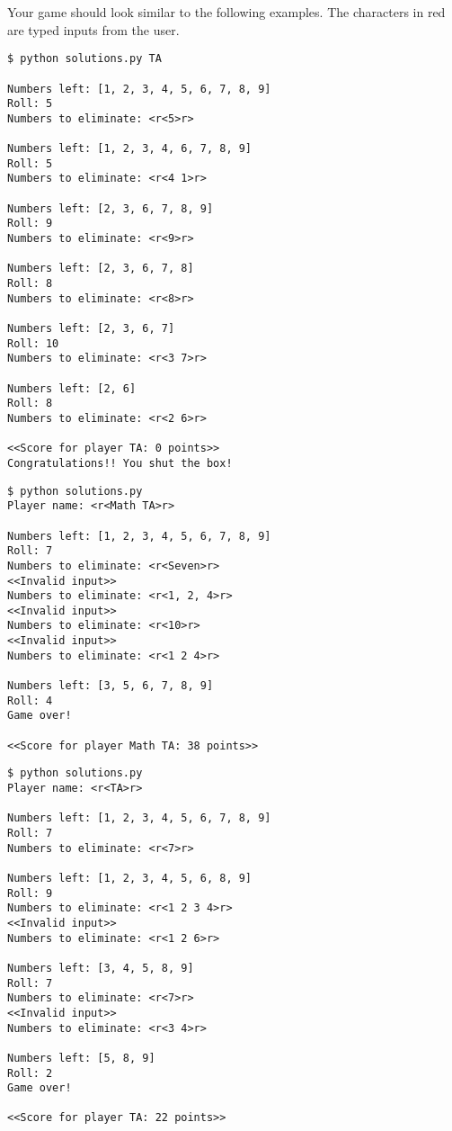 \begin{problem}
Your game should look similar to the following examples.
The characters in red are typed inputs from the user.

\begin{lstlisting}
$ python solutions.py TA

Numbers left: [1, 2, 3, 4, 5, 6, 7, 8, 9]
Roll: 5
Numbers to eliminate: <r<5>r>

Numbers left: [1, 2, 3, 4, 6, 7, 8, 9]
Roll: 5
Numbers to eliminate: <r<4 1>r>

Numbers left: [2, 3, 6, 7, 8, 9]
Roll: 9
Numbers to eliminate: <r<9>r>

Numbers left: [2, 3, 6, 7, 8]
Roll: 8
Numbers to eliminate: <r<8>r>

Numbers left: [2, 3, 6, 7]
Roll: 10
Numbers to eliminate: <r<3 7>r>

Numbers left: [2, 6]
Roll: 8
Numbers to eliminate: <r<2 6>r>

<<Score for player TA: 0 points>>
Congratulations!! You shut the box!
\end{lstlisting}
\begin{lstlisting}
$ python solutions.py
Player name: <r<Math TA>r>

Numbers left: [1, 2, 3, 4, 5, 6, 7, 8, 9]
Roll: 7
Numbers to eliminate: <r<Seven>r>
<<Invalid input>>
Numbers to eliminate: <r<1, 2, 4>r>
<<Invalid input>>
Numbers to eliminate: <r<10>r>
<<Invalid input>>
Numbers to eliminate: <r<1 2 4>r>

Numbers left: [3, 5, 6, 7, 8, 9]
Roll: 4
Game over!

<<Score for player Math TA: 38 points>>
\end{lstlisting}
\begin{lstlisting}
$ python solutions.py
Player name: <r<TA>r>

Numbers left: [1, 2, 3, 4, 5, 6, 7, 8, 9]
Roll: 7
Numbers to eliminate: <r<7>r>

Numbers left: [1, 2, 3, 4, 5, 6, 8, 9]
Roll: 9
Numbers to eliminate: <r<1 2 3 4>r>
<<Invalid input>>
Numbers to eliminate: <r<1 2 6>r>

Numbers left: [3, 4, 5, 8, 9]
Roll: 7
Numbers to eliminate: <r<7>r>
<<Invalid input>>
Numbers to eliminate: <r<3 4>r>

Numbers left: [5, 8, 9]
Roll: 2
Game over!

<<Score for player TA: 22 points>>
\end{lstlisting}
\end{problem}

\newpage

